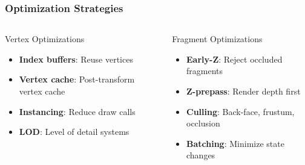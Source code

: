\begin{frame}
\frametitle{Optimization Strategies}

\begin{columns}
\begin{column}{0.5\textwidth}
\begin{conceptbox}{Vertex Optimizations}
\begin{itemize}
    \item \textbf{Index buffers}: Reuse vertices
    \item \textbf{Vertex cache}: Post-transform vertex cache
    \item \textbf{Instancing}: Reduce draw calls
    \item \textbf{LOD}: Level of detail systems
\end{itemize}
\end{conceptbox}
\end{column}

\begin{column}{0.5\textwidth}
\begin{conceptbox}{Fragment Optimizations}
\begin{itemize}
    \item \textbf{Early-Z}: Reject occluded fragments
    \item \textbf{Z-prepass}: Render depth first
    \item \textbf{Culling}: Back-face, frustum, occlusion
    \item \textbf{Batching}: Minimize state changes
\end{itemize}
\end{conceptbox}
\end{column}
\end{columns}

\vspace{0.5cm}

\begin{center}
\end{center}

\end{frame}

